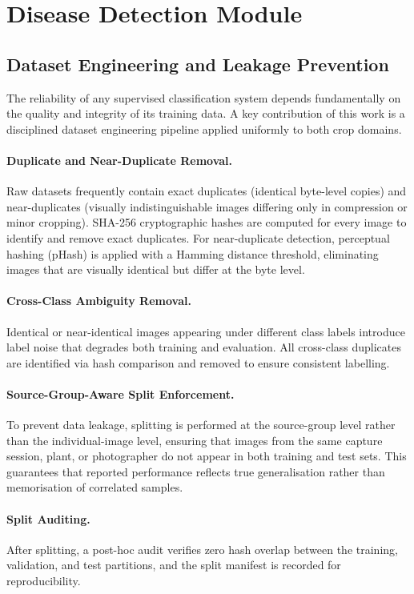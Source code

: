 \documentclass[12pt,a4paper]{report}
\begin{document}
\section{Disease Detection Module}

\subsection{Dataset Engineering and Leakage Prevention}
The reliability of any supervised classification system depends fundamentally on the quality and integrity of its training data. A key contribution of this work is a disciplined dataset engineering pipeline applied uniformly to both crop domains.

\paragraph{Duplicate and Near-Duplicate Removal.}
Raw datasets frequently contain exact duplicates (identical byte-level copies) and near-duplicates (visually indistinguishable images differing only in compression or minor cropping). SHA-256 cryptographic hashes are computed for every image to identify and remove exact duplicates. For near-duplicate detection, perceptual hashing (pHash) is applied with a Hamming distance threshold, eliminating images that are visually identical but differ at the byte level.

\paragraph{Cross-Class Ambiguity Removal.}
Identical or near-identical images appearing under different class labels introduce label noise that degrades both training and evaluation. All cross-class duplicates are identified via hash comparison and removed to ensure consistent labelling.

\paragraph{Source-Group-Aware Split Enforcement.}
To prevent data leakage, splitting is performed at the source-group level rather than the individual-image level, ensuring that images from the same capture session, plant, or photographer do not appear in both training and test sets. This guarantees that reported performance reflects true generalisation rather than memorisation of correlated samples.

\paragraph{Split Auditing.}
After splitting, a post-hoc audit verifies zero hash overlap between the training, validation, and test partitions, and the split manifest is recorded for reproducibility.
\end{document}
